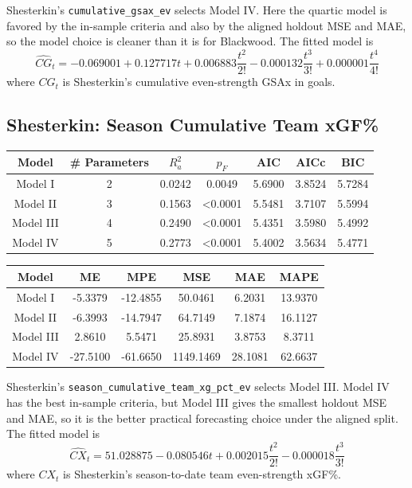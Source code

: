 \documentclass[
  10pt,
]{extarticle}
\begin{document}
Shesterkin's \texttt{cumulative\_gsax\_ev} selects Model IV. Here the quartic model is favored by the in-sample criteria and also by the aligned holdout MSE and MAE, so the model choice is cleaner than it is for Blackwood. The fitted model is
\[
\widehat{CG}_t = -0.069001 + 0.127717 t + 0.006883 \frac{t^2}{2!} - 0.000132 \frac{t^3}{3!} + 0.000001 \frac{t^4}{4!}
\]
where \(CG_t\) is Shesterkin's cumulative even-strength GSAx in goals.

\subsection{Shesterkin: Season Cumulative Team xGF\%}\label{shesterkin-season-cumulative-team-xgf}

\begin{center}
\normalsize

\begin{tabular}{ccccccc}
\toprule
Model & \# Parameters & $R_a^2$ & $p_F$ & AIC & AICc & BIC\\
\midrule
Model I & 2 & 0.0242 & 0.0049 & 5.6900 & 3.8524 & 5.7284\\
Model II & 3 & 0.1563 & <0.0001 & 5.5481 & 3.7107 & 5.5994\\
Model III & 4 & 0.2490 & <0.0001 & 5.4351 & 3.5980 & 5.4992\\
Model IV & 5 & 0.2773 & <0.0001 & 5.4002 & 3.5634 & 5.4771\\
\bottomrule
\end{tabular}
\normalsize
\end{center}\begin{center}
\normalsize

\begin{tabular}{cccccc}
\toprule
Model & ME & MPE & MSE & MAE & MAPE\\
\midrule
Model I & -5.3379 & -12.4855 & 50.0461 & 6.2031 & 13.9370\\
Model II & -6.3993 & -14.7947 & 64.7149 & 7.1874 & 16.1127\\
Model III & 2.8610 & 5.5471 & 25.8931 & 3.8753 & 8.3711\\
Model IV & -27.5100 & -61.6650 & 1149.1469 & 28.1081 & 62.6637\\
\bottomrule
\end{tabular}
\normalsize
\end{center}

Shesterkin's \texttt{season\_cumulative\_team\_xg\_pct\_ev} selects Model III. Model IV has the best in-sample criteria, but Model III gives the smallest holdout MSE and MAE, so it is the better practical forecasting choice under the aligned split. The fitted model is
\[
\widehat{CX}_t = 51.028875 - 0.080546 t + 0.002015 \frac{t^2}{2!} - 0.000018 \frac{t^3}{3!}
\]
where \(CX_t\) is Shesterkin's season-to-date team even-strength xGF\%.
\end{document}
